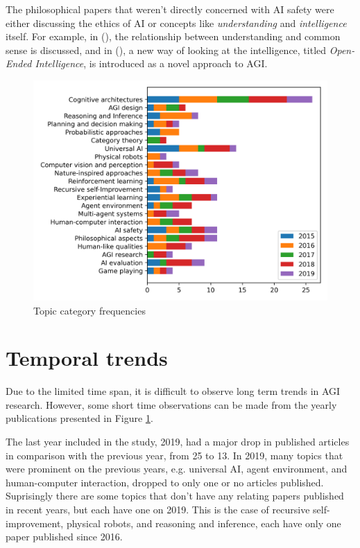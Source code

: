 \documentclass[utf8,english]{gradu3}
\begin{document}
The philosophical papers that weren't directly concerned with AI safety were
either discussing the ethics of AI or concepts like \emph{understanding} and
\emph{intelligence} itself. For example, in (\cite{thorisson2017understanding}),
the relationship between understanding and common sense is discussed, and in
(\cite[]{weinbaum2016Oopenended}), a new way of looking at the intelligence,
titled \emph{Open-Ended Intelligence}, is introduced as a novel approach to AGI.


\begin{figure}[H]
  \centering
  \includegraphics[scale=0.8]{material/data/topic_frequencies_by_year_asc.png}
  \caption{Topic category frequencies}
  \label{fig:topicbar}
\end{figure}

\section{Temporal trends}

Due to the limited time span, it is difficult to observe long term trends in AGI
research. However, some short time observations can be made from the yearly
publications presented in Figure \ref{fig:topicbar}. 

The last year included in the study, 2019, had a major drop in published
articles in comparison with the previous year, from 25 to 13. In 2019, many
topics that were prominent on the previous years, e.g. universal AI, agent
environment, and human-computer interaction, dropped to only one or no
articles published. Suprisingly there are some topics that don't have any
relating papers published in recent years, but each have one on 2019. This is
the case of recursive self-improvement, physical robots, and reasoning and
inference, each have only one paper published since 2016.
\end{document}
